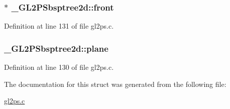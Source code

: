 \hypertarget{struct___g_l2_p_sbsptree2d_a3f41284e2e6400702967d4ab09515e0d}{}
\subsubsection[{front}]{$\ast$ \+\_\+\+G\+L2\+P\+Sbsptree2d\+::front}\label{struct___g_l2_p_sbsptree2d_a3f41284e2e6400702967d4ab09515e0d}


Definition at line 131 of file gl2ps.\+c.

\hypertarget{struct___g_l2_p_sbsptree2d_a195602391127a5004d544030767bed25}{}
\subsubsection[{plane}]{ \+\_\+\+G\+L2\+P\+Sbsptree2d\+::plane}\label{struct___g_l2_p_sbsptree2d_a195602391127a5004d544030767bed25}


Definition at line 130 of file gl2ps.\+c.



The documentation for this struct was generated from the following file\+:\begin{DoxyCompactItemize}
\item 
\hyperlink{gl2ps_8c}{gl2ps.\+c}\end{DoxyCompactItemize}
